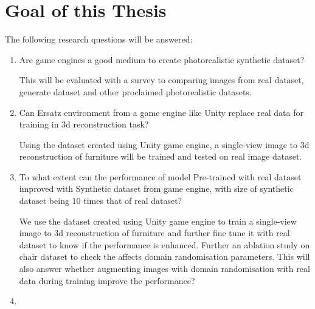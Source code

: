 \section{Goal of this Thesis}\label{sec:goal}

The following research questions will be answered:
\begin{enumerate}
    \item Are game engines a good medium to create photorealistic synthetic dataset?

    This will be evaluated with a survey to comparing images from real dataset, generate dataset and other proclaimed photorealistic datasets.
    \item Can Ersatz environment from a game engine like Unity replace real data for training in 3d reconstruction task?

    Using the dataset created using Unity game engine, a single-view image to 3d reconstruction of furniture will be trained and tested on real image dataset.

    \item To what extent can the performance of model Pre-trained with real dataset improved with Synthetic dataset from game engine,
            with size of synthetic dataset being 10 times that of real dataset?

    We use the dataset created using Unity game engine to train a single-view image to 3d reconstruction of furniture and further fine tune it with real dataset to know if the performance is enhanced.
    Further an ablation study on chair dataset to check the affects domain randomisation parameters.
    This will also answer whether augmenting images with domain randomisation with real data during training improve the performance?

    \item {}
\end{enumerate}

